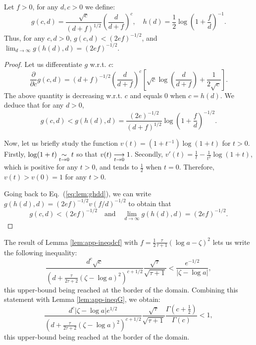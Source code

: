         \begin{lem}\label{lem:app-ineqdcf}
            Let $f>0$, for any $d,c>0$ we define:
            \begin{equation}
                g(c,d) = \frac{\sqrt{c}}{(d+f)^{1/2}}\left(\frac{d}{d+f}\right)^c, \quad h(d) = \frac{1}{2}\log\left(1+\frac{f}{d}\right)^{-1}.
            \end{equation}
            Thus, for any $c,d>0$, $g(c,d)<(2ef)^{-1/2}$, and $\displaystyle{\lim_{d\rightarrow\infty}g(h(d),d)=(2ef)^{-1/2}}.$
        \end{lem}
        \begin{proof}
            Let us differentiate $g$ w.r.t. $c$:
            \begin{equation}
                \frac{\partial}{\partial c}g(c,d) = (d+f)^{-1/2}\left(\frac{d}{d+f}\right)^c\left[\sqrt{c}\log\left(\frac{d}{d+f}  \right)+\frac{1}{2\sqrt{c}}\right].
            \end{equation}
            The above quantity is decreasing w.r.t. $c$ and equals $0$ when $c=h(d)$.
            We deduce that for any $d>0$, 
            \begin{equation}\label{eq:lem:ghdd}
                g(c,d)<g(h(d),d) = \frac{(2e)^{-1/2}}{(d+f)^{1/2}}\log\left(1+\frac{f}{d}\right)^{-1/2}.
            \end{equation}
            
            Now, let us briefly study the function $v(t)=(1+t^{-1})\log(1+t)$ for $t>0$.
            Firstly, $\log(1+t)\underset{t\rightarrow0}{\sim}t$ so that $v(t)\overset{\ }{\underset{t\rightarrow0}{\longrightarrow}}1$. Secondly, $v'(t) = \frac{1}{t}-\frac{1}{t^2}\log(1+t)$, which is positive for any $t>0$, and tends to $\frac{1}{2}$ when $t=0$. Therefore, $v(t)>v(0)=1$ for any $t>0$. 
    
            Going back to Eq.~(\ref{eq:lem:ghdd}), we can write $g(h(d),d)=(2ef)^{-1/2}v(f/d)^{-1/2}$ to obtain that
                \begin{equation}
                    g(c,d) <(2ef)^{-1/2}\quad\text{and} \quad \lim_{d\rightarrow\infty}g(h(d),d)=(2ef)^{-1/2}.
                \end{equation}
        \end{proof}
    
    The result of Lemma \ref{lem:app-ineqdcf} with $f=\frac{1}{2}\frac{\tau}{\tau+1}(\log a-\zeta)^2$ lets us write the following inequality:
        \begin{equation}
            \frac{d^c\sqrt{c}}{(d+\frac{\tau}{2\tau+2}(\zeta-\log a)^2 )^{c+1/2}}\frac{\sqrt{\tau}}{\sqrt{\tau +1}} < \frac{e^{-1/2}}{|\zeta-\log a|},
        \end{equation}
        this upper-bound being reached at the border of the domain. Combining this statement with Lemma \ref{lem:app-ineqG}, we obtain: 
            \begin{equation}
                \frac{d^c|\zeta-\log a|e^{1/2}}{(d+\frac{\tau}{2\tau+2}(\zeta-\log a)^2 )^{c+1/2}}\frac{\sqrt{\tau}}{\sqrt{\tau +1}}\frac{\Gamma(c+\frac{1}{2})}{\Gamma(c)} < 1,    
            \end{equation}
        this upper-bound being reached at the border of the domain.
    
